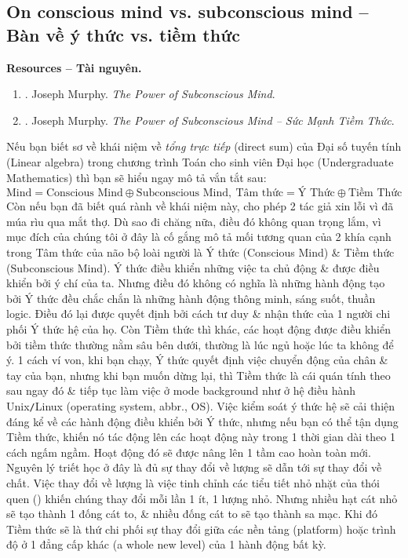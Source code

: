 \documentclass[12pt]{article}
\begin{document}
\subsection{On conscious mind vs. subconscious mind -- Bàn về ý thức vs. tiềm thức}
\textbf{\textsf{Resources -- Tài nguyên.}}
\begin{enumerate}
	\item \cite{Murphy_subconscious}. {\sc Joseph Murphy}. {\it The Power of Subconscious Mind}.
	\item \cite{Murphy_subconscious_VN}. {\sc Joseph Murphy}. {\it The Power of Subconscious Mind -- Sức Mạnh Tiềm Thức}.
\end{enumerate}
Nếu bạn biết sơ về khái niệm về {\it tổng trực tiếp} (direct sum) của Đại số tuyến tính (Linear algebra) trong chương trình Toán cho sinh viên Đại học (Undergraduate Mathematics) thì bạn sẽ hiểu ngay mô tả vắn tắt sau:
\begin{equation}
	\label{conscious + subconscious}
	\tag{mind}
	\mbox{Mind} = \mbox{Conscious Mind}\oplus\mbox{Subconscious Mind},\ \mbox{Tâm thức} = \mbox{Ý Thức}\oplus\mbox{Tiềm Thức}
\end{equation}
Còn nếu bạn đã biết quá rành về khái niệm này, cho phép 2 tác giả xin lỗi vì đã múa rìu qua mắt thợ. Dù sao đi chăng nữa, điều đó không quan trọng lắm, vì mục đích của chúng tôi ở đây là cố gắng mô tả mối tương quan của 2 khía cạnh trong Tâm thức của não bộ loài người là Ý thức (Conscious Mind) \& Tiềm thức (Subconscious Mind). Ý thức điều khiển những việc ta chủ động \& được điều khiển bởi ý chí của ta. Nhưng điều đó không có nghĩa là những hành động tạo bởi Ý thức đều chắc chắn là những hành động thông minh, sáng suốt, thuần logic. Điều đó lại được quyết định bởi cách tư duy \& nhận thức của 1 người chi phối Ý thức hệ của họ. Còn Tiềm thức thì khác, các hoạt động được điều khiển bởi tiềm thức thường nằm sâu bên dưới, thường là lúc ngủ hoặc lúc ta không để ý. 1 cách ví von, khi bạn chạy, Ý thức quyết định việc chuyển động của chân \& tay của bạn, nhưng khi bạn muốn dừng lại, thì Tiềm thức là cái quán tính theo sau ngay đó \& tiếp tục làm việc ở mode background như ở hệ điều hành Unix{\tt/}Linux (operating system, abbr., OS). Việc kiểm soát ý thức hệ sẽ cải thiện đáng kể về các hành động điều khiển bởi Ý thức, nhưng nếu bạn có thể tận dụng Tiềm thức, khiến nó tác động lên các hoạt động này trong 1 thời gian dài theo 1 cách ngấm ngầm. Hoạt động đó sẽ được nâng lên 1 tầm cao hoàn toàn mới. Nguyên lý triết học ở đây là đủ sự thay đổi về lượng sẽ dẫn tới sự thay đổi về chất. Việc thay đổi về lượng là việc tinh chỉnh các tiểu tiết nhỏ nhặt của thói quen (\cite{Clear_habit,Clear_habit_VN,Duhigg_habit,Duhigg_habit_VN}) khiến chúng thay đổi mỗi lần 1 ít, 1 lượng nhỏ. Nhưng nhiều hạt cát nhỏ sẽ tạo thành 1 đống cát to, \& nhiều đống cát to sẽ tạo thành sa mạc. Khi đó Tiềm thức sẽ là thứ chi phối sự thay đổi giữa các nền tảng (platform) hoặc trình độ ở 1 đẳng cấp khác (a whole new level) của 1 hành động bất kỳ.
\end{document}
